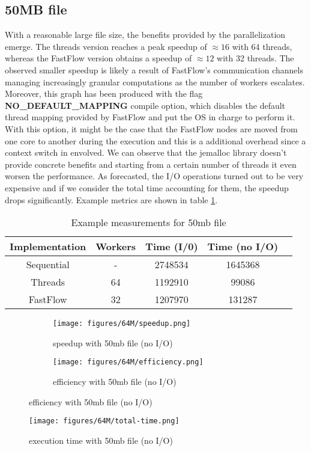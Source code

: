 \documentclass{article}
\begin{document}
\subsection{50MB file}
With a reasonable large file size, the benefits provided by the parallelization emerge.
The threads version reaches a peak speedup of $\approx 16$ with 64 threads,
whereas the FastFlow version obtains a speedup of $\approx 12$ with 32 threads.
The observed smaller speedup is likely a result of FastFlow's communication channels managing
increasingly granular computations as the number of workers escalates.
Moreover, this graph has been produced with the flag \textbf{NO\_DEFAULT\_MAPPING}
compile option, which
disables the default thread mapping provided by FastFlow and put the OS in charge to perform it.
With this option, it might be the case that the FastFlow nodes are moved from one core to another
during the execution and this is a additional overhead since a context switch in envolved.
We can observe that the jemalloc library doesn't provide concrete benefits
and starting from a certain number of threads it even worsen the performance.
As forecasted, the I/O operations turned out to be very expensive and if
we consider the total time accounting for them, the speedup drops significantly.
Example metrics are shown in table \ref{tab:measurements}.
\begin{table}[H]
    \centering
    \begin{tabular}{|c|c|c|c|c|}
        \hline
        Implementation & Workers & Time (I/0) & Time (no I/O) \\
        \hline
        Sequential     & -       & 2748534    & 1645368       \\
        Threads        & 64      & 1192910    & 99086         \\
        FastFlow       & 32      & 1207970    & 131287        \\
        \hline
    \end{tabular}
    \caption{Example measurements for 50mb file}
    \label{tab:measurements}
\end{table}

\begin{figure}[H]
    \begin{subfigure}{0.6\textwidth}
        \centering
        \texttt{[image: figures/64M/speedup.png]}
        \caption{speedup with 50mb file (no I/O)}
        \label{fig:speedup-50mb}
    \end{subfigure}
    \begin{subfigure}{0.6\textwidth}
        \centering
        \texttt{[image: figures/64M/efficiency.png]}
        \caption{efficiency with 50mb file (no I/O)}
        \label{fig:efficiency-50mb}
    \end{subfigure}
\end{figure}
\begin{figure}[H]
        \centering
        \texttt{[image: figures/64M/total-time.png]}
        \caption{execution time with 50mb file (no I/O)}
        \label{fig:total-time-50mb}
\end{figure}
\end{document}
